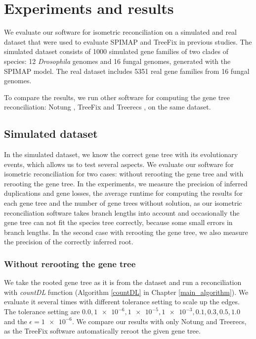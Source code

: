 \chapter{Experiments and results}

We evaluate our software for isometric reconciliation on a simulated and real dataset that were used to evaluate SPIMAP \cite{spimap} and TreeFix \cite{treefix} in previous studies. The simulated dataset consists of 1000 simulated gene families of two clades of species: 12 \emph{Drosophila} genomes and 16 fungal genomes, generated with the SPIMAP model. The real dataset includes 5351 real gene families from 16 fungal genomes.

To compare the results, we run other software for computing the gene tree reconciliation: Notung \cite{notung}, TreeFix \cite{treefix} and Treerecs \cite{treerecs}, on the same dataset.

\section{Simulated dataset}

In the simulated dataset, we know the correct gene tree with its evolutionary events, which allows us to test several aspects. We evaluate our software for isometric reconciliation for two cases: without rerooting the gene tree and with rerooting the gene tree. In the experiments, we measure the precision of inferred duplications and gene losses, the average runtime for computing the results for each gene tree and the number of gene trees without solution, as our isometric reconciliation software takes branch lengths into account and occasionally the gene tree can not fit the species tree correctly, because some small errors in branch lengths. In the second case with rerooting the gene tree, we also measure the precision of the correctly inferred root.

\subsection{Without rerooting the gene tree} \label{without_rerooting_the_gene_tree}

We take the rooted gene tree as it is from the dataset and run a reconciliation with \emph{countDL} function (Algorithm \ref{countDL} in Chapter \ref{main_algorithm}). We evaluate it several times with different tolerance setting to scale up the edges. The tolerance setting are $0.0, \num{1e-6}, \num{1e-5}, \num{1e-3}, 0.1, 0.3, 0.5, 1.0$ and the $\epsilon = \num{1e-6}$. We compare our results with only Notung and Treerecs, as the TreeFix software automatically reroot the given gene tree.

